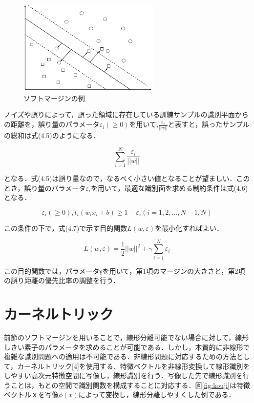 \begin{figure}[htbp]
  \begin{center}
    \includegraphics[clip,width=7.0cm]{./images/softma.png}
    \caption{ソフトマージンの例}
    \label{fig:softma}
  \end{center}
\end{figure}

\newpage

ノイズや誤りによって，誤った領域に存在している訓練サンプルの識別平面からの距離を，誤り量のパラメータ$ ε_i (\geq 0) $を用いて,$ \frac{ε_i}{||w||}$と表すと，誤ったサンプルの総和は式(4.5)のようになる．

\begin{equation}
      \sum_{i=1}^N \frac{ε_i}{||w||}
\end{equation}

となる．式(4.5)は誤り量なので，なるべく小さい値となることが望ましい．このとき，誤り量のパラメータ$ ε_i $を用いて，最適な識別面を求める制約条件は式(4.6)となる．

\begin{equation}
      ε_i (\geq 0), t_i(w_i x_i + b) \geq 1 - ε_i (i = 1,2,...,N-1,N)
\end{equation}

この条件の下で，式(4.7)で示す目的関数$ L(w,ε) $を最小化すればよい．

\begin{equation}
      L(w,ε) = \frac{1}{2} ||w||^2 + γ\sum_{i=1}^Nε_i
\end{equation}

この目的関数では，パラメータγを用いて，第1項のマージンの大きさと，第2項の誤り距離の優先比率の調整を行う．

\newpage

\section{カーネルトリック}
前節のソフトマージンを用いることで，線形分離可能でない場合に対して，線形しきい素子のパラメータを求めることが可能である．しかし，本質的に非線形で複雑な識別問題への適用は不可能である．非線形問題に対応するための方法として，カーネルトリック[4]を使用する．特徴ベクトルを非線形変換して線形識別をしやすい高次元特徴空間に写像し，線形識別を行う．写像した先で線形識別を行うことは，もとの空間で識別関数を構成することに対応する．図\ref{fig:kouji}は特徴ベクトルｘを写像$ \phi(x) $によって変換し，線形分離しやすくした例である．

